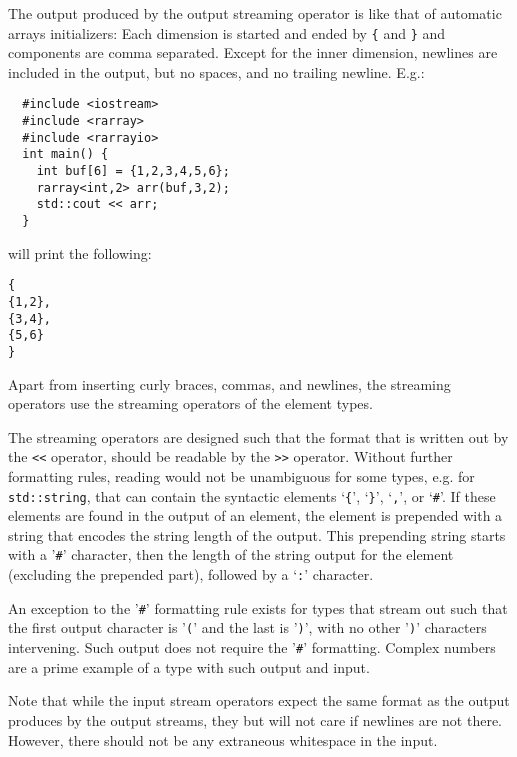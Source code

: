 \documentclass[11pt,twoside]{article}
\begin{document}
The output produced by the output streaming operator is like that of
automatic arrays initializers: Each dimension is started and ended by
\texttt{\{} and \texttt{\}} and components are comma separated.
Except for the inner dimension, newlines are included in the output,
but no spaces, and no trailing newline.
E.g.:\vspace{-9pt}
\begin{framed}\vspace{-18pt}%
\begin{verbatim}
  #include <iostream>
  #include <rarray>
  #include <rarrayio>
  int main() {
    int buf[6] = {1,2,3,4,5,6};
    rarray<int,2> arr(buf,3,2);
    std::cout << arr;
  }
\end{verbatim}%
\vspace{-12pt}
\end{framed}\vspace{-8pt}\noindent
will print the following:
\begin{verbatim}
{
{1,2},
{3,4},
{5,6}
}
\end{verbatim}
Apart from inserting curly braces, commas, and newlines, the streaming
operators use the streaming operators of the element types. 

The streaming operators are designed such that the format that is
written out by the \texttt{<<} operator, should be readable by the
\texttt{>>} operator.  
Without further formatting rules, reading would not be unambiguous for
some types, e.g. for
\texttt{std::string}, that can contain the syntactic elements
`\texttt{\{}', `\texttt{\}}', `\texttt{,}', or `\texttt{\#}'.  If these elements are found in the output of an element, the element is prepended with a string that encodes the string length of the output. This prepending string starts with a '\texttt\#' character, then the length of the string output for the element  (excluding the prepended part), followed by a `\texttt:' character.

An exception to the '\texttt\#' formatting rule exists for types that
stream out such that the first output character is '\texttt(' and the
last is '\texttt)', with no other '\texttt)' characters
intervening. Such output does not require the '\texttt\#'
formatting. Complex numbers are a prime example of a type with such
output and input.

Note that while the input stream operators expect the same format as
the output produces by the output streams, they but will
not care if newlines are not there. However, there should not be any extraneous
whitespace in the input.
\end{document}
